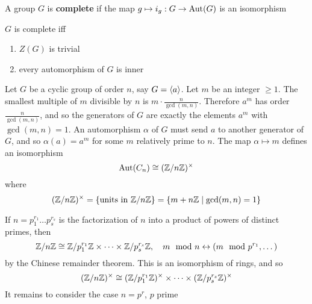 \documentclass[11pt]{article}
\begin{document}
\begin{definition}[]
A group \(G\) is \textbf{complete} if the map \(g\mapsto i_g:G\to\operatorname{\text{Aut}}(G)\) is an isomorphism
\end{definition}

\(G\) is complete iff
\begin{enumerate}
\item \(Z(G)\) is trivial
\item every automorphism of \(G\) is inner
\end{enumerate}


Let \(G\) be a cyclic group of order \(n\), say \(G=\langle a\rangle\). Let \(m\) be an integer \(\ge 1\). The
smallest multiple of \(m\) divisible by \(n\) is \(m\cdot\frac{n}{\gcd(m,n)}\). Therefore \(a^m\) has
order \(\frac{n}{\gcd(m,n)}\), and so the generators of \(G\) are exactly the elements \(a^m\)
with \(\gcd(m,n)=1\). An automorphism \(\alpha\) of \(G\) must send \(a\) to another generator of \(G\),
and so \(\alpha(a)=a^m\) for some \(m\) relatively prime to \(n\). The map \(\alpha\mapsto m\) defines an
isomorphism
\begin{equation*}
\operatorname{\text{Aut}}(C_n)\cong(\mathbb{Z}/n\mathbb{Z})^{\times}
\end{equation*}
where
\begin{equation*}
(\mathbb{Z}/n\mathbb{Z})^{\times}=\{\text{units in }\mathbb{Z}/n\mathbb{Z}\}=\{m+n\mathbb{Z}\mid\gcd(m,n)=1\}
\end{equation*}

If \(n=p_1^{r_1}\dots p_s^{r_s}\) is the factorization of \(n\) into a product of powers of distinct
primes, then
\begin{equation*}
\mathbb{Z}/n\mathbb{Z}\cong\mathbb{Z}/p_1^{r_1}\mathbb{Z}\times\dots\times\mathbb{Z}/p_s^{r_s}\mathbb{Z},\quad m\mod n\leftrightarrow(m\mod p^{r_1},\dots)
\end{equation*}
by the Chinese remainder theorem. This is an isomorphism of rings, and so
\begin{equation*}
(\mathbb{Z}/n\mathbb{Z})^\times\cong(\mathbb{Z}/p_1^{r_1}\mathbb{Z})^{\times}\times\dots\times(\mathbb{Z}/p_s^{r_s}\mathbb{Z})^{\times}
\end{equation*}
It remains to consider the case \(n=p^r\), \(p\) prime
\end{document}
